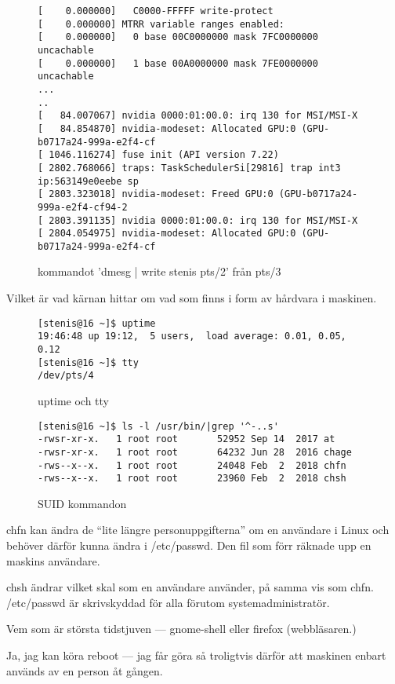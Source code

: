 \documentclass[a4paper]{article}
\begin{document}
\begin{figure}
\begin{verbatim}
[    0.000000]   C0000-FFFFF write-protect
[    0.000000] MTRR variable ranges enabled:
[    0.000000]   0 base 00C0000000 mask 7FC0000000 uncachable
[    0.000000]   1 base 00A0000000 mask 7FE0000000 uncachable
...
..
[   84.007067] nvidia 0000:01:00.0: irq 130 for MSI/MSI-X
[   84.854870] nvidia-modeset: Allocated GPU:0 (GPU-b0717a24-999a-e2f4-cf
[ 1046.116274] fuse init (API version 7.22)
[ 2802.768066] traps: TaskSchedulerSi[29816] trap int3 ip:563149e0eebe sp
[ 2803.323018] nvidia-modeset: Freed GPU:0 (GPU-b0717a24-999a-e2f4-cf94-2
[ 2803.391135] nvidia 0000:01:00.0: irq 130 for MSI/MSI-X
[ 2804.054975] nvidia-modeset: Allocated GPU:0 (GPU-b0717a24-999a-e2f4-cf
\end{verbatim}
\caption{kommandot 'dmesg | write stenis pts/2' från pts/3}
\end{figure}
Vilket är vad kärnan hittar om vad som finns i form av hårdvara i maskinen.

\begin{figure}
\begin{verbatim}
[stenis@16 ~]$ uptime
19:46:48 up 19:12,  5 users,  load average: 0.01, 0.05, 0.12
[stenis@16 ~]$ tty
/dev/pts/4
\end{verbatim}
\caption{uptime och tty}
\end{figure}


\begin{figure}
\begin{verbatim}
[stenis@16 ~]$ ls -l /usr/bin/|grep '^-..s' 
-rwsr-xr-x.   1 root root       52952 Sep 14  2017 at
-rwsr-xr-x.   1 root root       64232 Jun 28  2016 chage
-rws--x--x.   1 root root       24048 Feb  2  2018 chfn
-rws--x--x.   1 root root       23960 Feb  2  2018 chsh
\end{verbatim}
\caption{SUID kommandon}
\end{figure}

chfn kan ändra de ``lite längre personuppgifterna'' om en användare i Linux
och behöver därför kunna ändra i /etc/passwd. Den fil som förr räknade upp en maskins
användare.

chsh ändrar vilket skal som en användare använder, på samma vis som chfn.
/etc/passwd är skrivskyddad för alla förutom systemadministratör.

Vem som är största tidstjuven --- gnome-shell eller firefox (webbläsaren.)

Ja, jag kan köra reboot --- jag får göra så troligtvis därför att maskinen enbart används
av en person åt gången.
\end{document}
